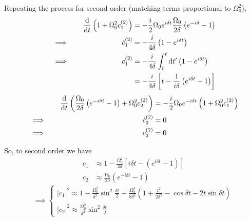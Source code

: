 \documentclass[12pt]{article}
\newcommand{\magsq}[1]{\big|#1\big|^2}
\begin{document}
Repeating the process for second order (matching terms proportional to $\Omega_0^2$),
\begin{alignat*}{3}
    &\quad & \dv{t}\left(1 + \Omega_0^2 c_1^{(2)}\right) &= -\frac{i}{2}\Omega_0e^{i\delta t}\frac{\Omega_0}{2\delta}\left(e^{-i\delta}-1\right) \\
    &\implies\quad & \dot{c}_1^{(2)} &= -\frac{i}{4\delta}\left(1 - e^{i\delta t}\right) \\
    &\implies\quad & c_1^{(2)} &= -\frac{i}{4\delta}\int_0^t \dd t'\left(1 - e^{i\delta t}\right) \\
    & & &= -\frac{i}{4\delta}\left[t - \frac{1}{i\delta}\left(e^{i\delta t} - 1\right)\right]
\end{alignat*}
\begin{alignat*}{3}
    &\quad & \dv{t}\left(\frac{\Omega_0}{2\delta}\left(e^{-i\delta t} - 1\right) + \Omega_0^2c_2^{(2)}\right) &= -\frac{i}{2}\Omega_0e^{-i\delta t}\left(1 + \Omega_0^2 c_1^{(2)}\right) \\
    &\implies\quad & \dot{c}_2^{(2)} &= 0 \\
    &\implies\quad & c_2^{(2)} &= 0
\end{alignat*}

So, to second order we have
\begin{equation*}
    \begin{aligned}
        c_1 &\approx 1 - \frac{\Omega_0^2}{4\delta}\left[i\delta t - \left(e^{i\delta t} - 1\right)\right] \\
        c_2 &\approx \frac{\Omega_0}{2\delta}\left(e^{-i\delta t} - 1\right)
    \end{aligned}
\end{equation*}
\begin{equation*}
    \implies
    \begin{cases*}
        \magsq{c_1} \approx 1 - \frac{\Omega_0^2}{\delta^2}\sin^2\frac{\delta t}{2} + \frac{\Omega_0^4}{8\delta^4}\left(1 + \frac{t^2}{2\delta^2} - \cos\delta t - 2t\sin\delta t\right)  \\
        \magsq{c_2} \approx \frac{\Omega_0^2}{\delta^2}\sin^2\frac{\delta t}{2}
    \end{cases*}
\end{equation*}
\end{document}
